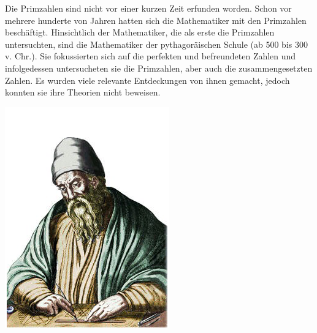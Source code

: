 \begin{minipage}{0.65\linewidth}
Die Primzahlen sind nicht vor einer kurzen Zeit erfunden
worden. Schon vor mehrere hunderte von Jahren hatten sich
die Mathematiker mit den Primzahlen beschäftigt.
Hinsichtlich der Mathematiker, die als erste die Primzahlen
untersuchten, sind die Mathematiker der pythagoräischen
Schule (ab 500 bis 300 v. Chr.). Sie fokussierten sich auf
die perfekten und befreundeten Zahlen und infolgedessen
untersucheten sie die Primzahlen, aber auch die
zusammengesetzten Zahlen. Es wurden viele relevante
Entdeckungen von ihnen gemacht, jedoch konnten sie ihre
Theorien nicht beweisen.
\end{minipage}
\hfil
\begin{minipage}[r]{0.3\linewidth}
  \captionsetup{type=figure,font=small,skip=6pt,format=plain}%
  \capstart
  \includegraphics[width=1.0\linewidth]{./images/euklid.png}

\end{minipage}
